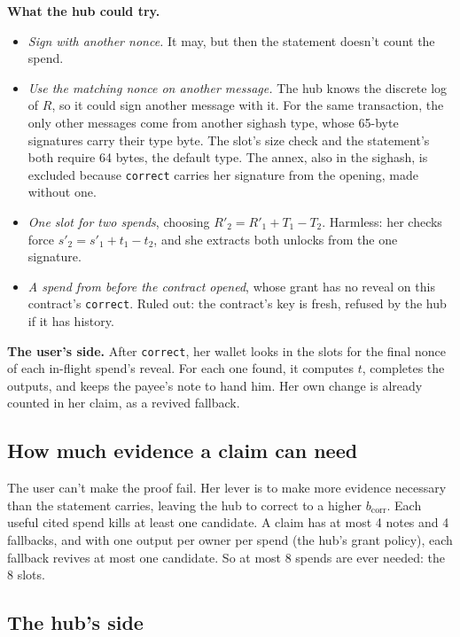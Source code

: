 \documentclass[11pt]{article}
\newcommand{\bcorr}{b_{\mathrm{corr}}}
\newcommand{\tx}[1]{\texttt{#1}}
\begin{document}
\textbf{What the hub could try.}
\begin{itemize}[nosep]
\item \emph{Sign with another nonce.} It may, but then the statement
  doesn't count the spend.
\item \emph{Use the matching nonce on another message.} The hub knows
  the discrete log of $R$, so it could sign another message with it.
  For the same transaction, the only other messages come from another
  sighash type, whose 65-byte signatures carry their type byte. The
  slot's size check and the statement's both require 64 bytes, the
  default type. The annex, also in the sighash, is excluded because
  \tx{correct} carries her signature from the opening, made without
  one.
\item \emph{One slot for two spends}, choosing $R'_2 = R'_1 + T_1 - T_2$.
  Harmless: her checks force $s'_2 = s'_1 + t_1 - t_2$, and she
  extracts both unlocks from the one signature.
\item \emph{A spend from before the contract opened}, whose grant has no
  reveal on this contract's \tx{correct}. Ruled out: the contract's key
  is fresh, refused by the hub if it has history.
\end{itemize}

\textbf{The user's side.} After \tx{correct}, her wallet looks in the
slots for the final nonce of each in-flight spend's reveal. For each
one found, it computes $t$, completes the outputs, and keeps the payee's
note to hand him. Her own change is already counted in her claim, as a
revived fallback.

\subsection{How much evidence a claim can need}\label{sec:volume}

The user can't make the proof fail. Her lever is to make more evidence
necessary than the statement carries, leaving the hub to correct to a
higher $\bcorr$. Each useful cited spend kills at least one candidate.
A claim has at most 4 notes and 4 fallbacks, and with one output per
owner per spend (the hub's grant policy), each fallback revives at most
one candidate. So at most 8 spends are ever needed: the 8 slots.

\subsection{The hub's side}
\end{document}
